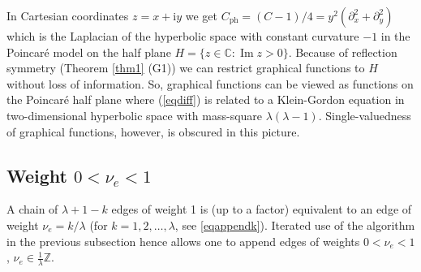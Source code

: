 \documentclass[oneside]{amsart}
\newcommand{\CC}{{\mathbb C}}
\newcommand{\ZZ}{{\mathbb Z}}
\newcommand{\ii}{\mathrm{i}}
\renewcommand{\Im}{\mathop\mathrm{Im}}
\theoremstyle{plain}
\begin{document}
In Cartesian coordinates $z=x+\ii y$ we get $C_{\mathrm{ph}}=(C-1)/4=y^2(\partial_x^2+\partial_y^2)$ which is the Laplacian of the hyperbolic space with constant
curvature $-1$ in the Poincar\'e model on the half plane $H=\{z\in\CC: \Im z>0\}$. Because of reflection symmetry (Theorem \ref{thm1} (G1)) we can restrict graphical functions
to $H$ without loss of information. So, graphical functions can be viewed as functions on the Poincar\'e half plane where (\ref{eqdiff}) is related to a Klein-Gordon equation
in two-dimensional hyperbolic space with mass-square $\lambda(\lambda-1)$. Single-valuedness of graphical functions, however, is obscured in this picture.

\subsection{Weight \texorpdfstring{$0<\nu_e<1$}{0<nu(e)<1}}\label{sectnu01}
A chain of $\lambda+1-k$ edges of weight 1 is (up to a factor) equivalent to an edge of weight $\nu_e=k/\lambda$ (for $k=1,2,\ldots,\lambda$, see \eqref{eqappendk}).
Iterated use of the algorithm in the previous subsection hence allows one to append edges of weights $0<\nu_e<1$, $\nu_e\in\frac{1}{\lambda}\ZZ$.
\end{document}
